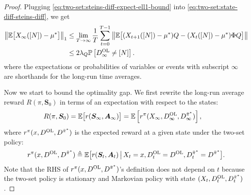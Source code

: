 \documentclass[11pt,letterpaper]{article}
\theoremstyle{plain}
\theoremstyle{definition}
\theoremstyle{remark}
\newcommand{\norm}[1]{\left\lVert#1\right\rVert}
\newcommand{\normbig}[1]{\big\lVert#1\big\rVert}
\newcommand{\E}[1]{\mathbb{E}\left[#1\right]}
\newcommand{\Ebig}[1]{\mathbb{E}\big[#1\big]}
\newcommand{\givenbig}{\,\big|\,}
\newcommand{\Prob}[1]{\mathbb{P}\left[#1\right]}
\newcommand{\ve}[1]{\bm{#1}}
\newcommand{\veS}{\ve{S}}
\newcommand{\veA}{\ve{A}}
\newcommand{\ravg}{R}
\newcommand{\rsysn}{\ravg(\pi, \veS_0)}
\newcommand{\pibar}{{\sysbar{\pi}}}
\newcommand{\pibs}{{\pibar^*}}
\newcommand{\sysbar}[1]{\bar{#1}}
\newcommand{\statdist}{\mu^*}
\newcommand{\Da}{D^{\pibs}}
\newcommand{\Db}{D^{\textup{OL}}}
\newcommand{\lamq}{\lambda_{Q}}
\begin{document}
\begin{proof}
    Plugging \eqref{eq:two-set:steins-diff-expect-ell1-bound} into \eqref{eq:two-set:state-diff-steins-diff}, we get 
    \begin{align}
        \nonumber
        \normbig{\Ebig{X_\infty([N]) - \statdist} }_1 
        &\leq \lim_{T\to\infty} \frac{1}{T} \sum_{t=0}^{T-1} \norm{\Ebig{(X_{t+1}([N])-\statdist)Q - (X_t([N])-\statdist)\Phi Q}} \\
         \label{eq:two-set:state-diff-expect-prob-bound}
        &\leq 2\lamq \Prob{\Db_\infty \neq [N]}.
    \end{align}
    where the expectations or probabilities of variables or events with subscript $\infty$ are shorthands for the long-run time averages. 

    Now we start to bound the optimality gap. We first rewrite the long-run average reward $\rsysn$ in terms of an expectation with respect to the states:  
    \begin{align}
        \nonumber
        \rsysn 
        &= \Ebig{r(\veS_\infty, \veA_\infty)} 
        =  \E{r^\pi(X_\infty, \Db_\infty, \Da_\infty)}, 
    \end{align}
    where $r^\pi(x, \Db, \Da)$ is the expected reward at a given state under the two-set policy: 
    \[
        r^\pi(x, \Db, \Da) \triangleq \Ebig{r(\veS_t, \veA_t) \givenbig X_t = x, \Db_t = \Db, \Da_t = \Da}. 
    \]
    Note that the RHS of $r^\pi(x, \Db, \Da)$'s definition does not depend on $t$ because the two-set policy is stationary and Markovian policy with state $(X_t, \Db_t, \Da_t)$. 


\end{proof}
\end{document}
